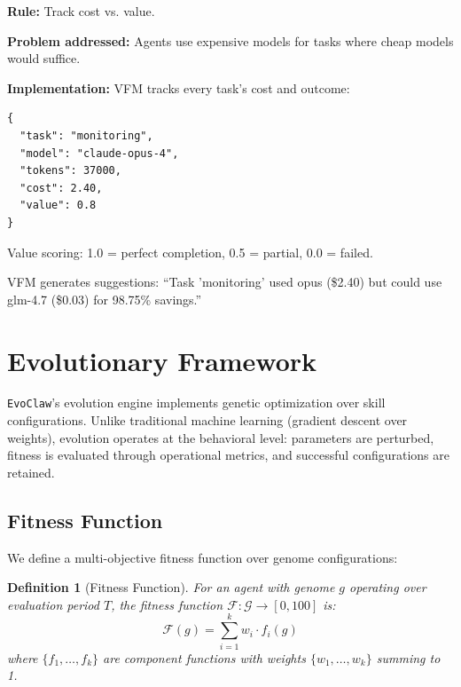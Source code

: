 \documentclass[conference]{IEEEtran}
\newcommand{\evoclaw}{\texttt{EvoClaw}\xspace}
\newcommand{\genomespace}{\mathcal{G}}
\newcommand{\fitnessfn}{\mathcal{F}}
\newtheorem{definition}[theorem]{Definition}
\begin{document}
\textbf{Rule:} Track cost vs. value.

\textbf{Problem addressed:} Agents use expensive models for tasks where cheap models would suffice.

\textbf{Implementation:} VFM tracks every task's cost and outcome:

\begin{lstlisting}[style=jsoncode]
{
  "task": "monitoring",
  "model": "claude-opus-4",
  "tokens": 37000,
  "cost": 2.40,
  "value": 0.8
}
\end{lstlisting}

Value scoring: 1.0 = perfect completion, 0.5 = partial, 0.0 = failed.

VFM generates suggestions: ``Task 'monitoring' used opus (\$2.40) but could use glm-4.7 (\$0.03) for 98.75\% savings.''



\section{Evolutionary Framework}
\label{sec:evolution}

\evoclaw{}'s evolution engine implements genetic optimization over skill configurations. Unlike traditional machine learning (gradient descent over weights), evolution operates at the behavioral level: parameters are perturbed, fitness is evaluated through operational metrics, and successful configurations are retained.

\subsection{Fitness Function}

We define a multi-objective fitness function over genome configurations:

\begin{definition}[Fitness Function]
For an agent with genome $g$ operating over evaluation period $T$, the fitness function $\fitnessfn: \genomespace \to [0, 100]$ is:
\begin{equation}
\fitnessfn(g) = \sum_{i=1}^{k} w_i \cdot f_i(g)
\end{equation}
where $\{f_1, \ldots, f_k\}$ are component functions with weights $\{w_1, \ldots, w_k\}$ summing to 1.
\end{definition}
\end{document}
